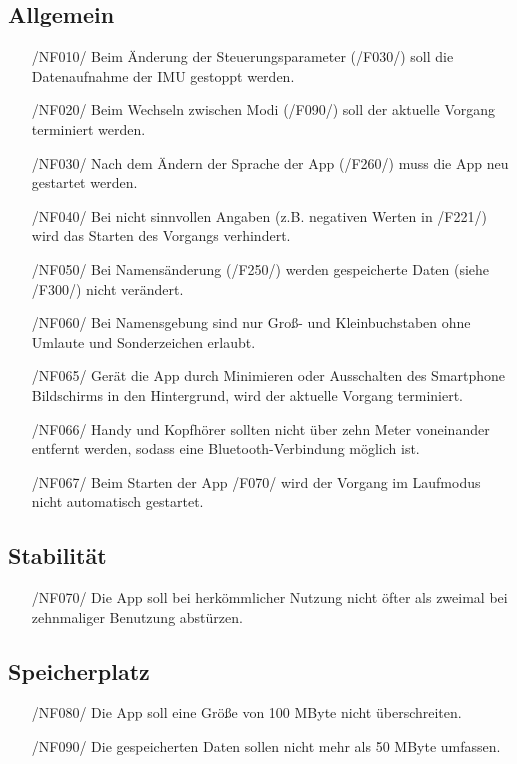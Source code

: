 \documentclass[a4paper,12pt]{article}
\begin{document}
\subsection{Allgemein}
\begin{itemize}
  \item[/NF010/] Beim Änderung der Steuerungsparameter (/F030/) soll die Datenaufnahme der \Gls{IMU} gestoppt werden.
  \item[/NF020/] Beim Wechseln zwischen Modi (/F090/) soll der aktuelle Vorgang terminiert werden.
  \item[/NF030/] Nach dem Ändern der Sprache der App (/F260/) muss die App neu gestartet werden.
  \item[/NF040/] Bei nicht sinnvollen Angaben (z.B. negativen Werten in /F221/) wird das Starten des Vorgangs verhindert.
  \item[/NF050/] Bei Namensänderung (/F250/) werden gespeicherte Daten (siehe /F300/) nicht verändert.
  \item[/NF060/] Bei Namensgebung sind nur Groß- und Kleinbuchstaben ohne Umlaute und Sonderzeichen erlaubt.
  \item[/NF065/] Gerät die App durch Minimieren oder Ausschalten des Smartphone Bildschirms in den Hintergrund, wird der aktuelle Vorgang terminiert.
  \item[/NF066/] Handy und Kopfhörer sollten nicht über zehn Meter voneinander entfernt werden, sodass eine Bluetooth-Verbindung möglich ist. 
  \item[/NF067/] Beim Starten der App /F070/ wird der Vorgang im Laufmodus nicht automatisch gestartet.
\end{itemize}
\subsection{Stabilität}
\begin{itemize}
  \item[/NF070/] Die App soll bei herkömmlicher Nutzung nicht öfter als zweimal bei zehnmaliger Benutzung abstürzen. 
\end{itemize}
\subsection{Speicherplatz}
\begin{itemize}
  \item[/NF080/] Die App soll eine Größe von 100 MByte nicht überschreiten. 
  \item[/NF090/] Die gespeicherten Daten sollen nicht mehr als 50 MByte umfassen. 
\end{itemize}
\end{document}

